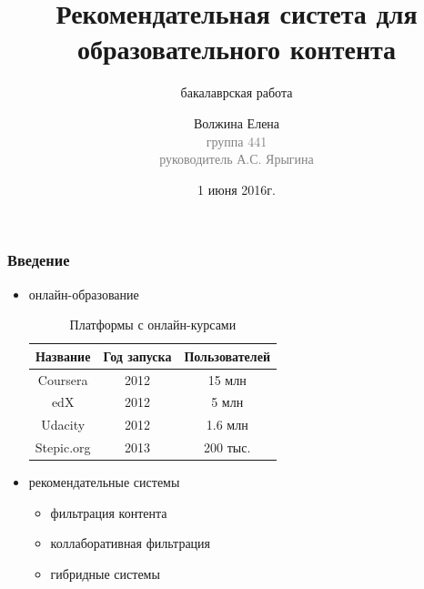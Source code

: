 \documentclass{beamer}
\begin{document}
\title{Рекомендательная систета для образовательного контента}
\subtitle{бакалаврская работа}
\author{Волжина Елена\\{\footnotesize\textcolor{gray}{группа 441\\руководитель А.С. Ярыгина}}}
\date{1 июня 2016г.}
\frame{\titlepage}

\begin{frame}\frametitle{Введение}
\begin{itemize}
\item онлайн-образование
    \begin{table}[t]
        \caption{Платформы с онлайн-курсами}
        \begin{center}
        \begin{tabular}{c|c|c}
        \hline
        Название & Год запуска & Пользователей \\
        \hline
        \hline
        Coursera & 2012 & 15 млн \\
        edX & 2012 & 5 млн \\
        Udacity & 2012 & 1.6 млн \\
        Stepic.org & 2013 & 200 тыс. \\
        \hline
        \end{tabular}
        \end{center}
    \end{table}

\bigskip
\item рекомендательные системы\cite{rec_sys_handbook}
    \begin{itemize}
        \item фильтрация контента
        \item коллаборативная фильтрация
        \item гибридные системы
    \end{itemize}
\end{itemize}
\end{frame}
\end{document}
